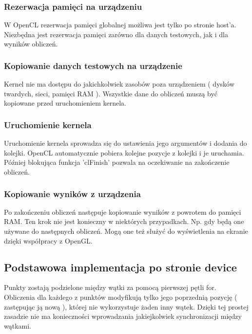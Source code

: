 \subsubsection{ Rezerwacja pamięci na urządzeniu }

W OpenCL rezerwacja pamięci globalnej możliwa jest tylko po stronie host'a. Niezbędna jest rezerwacja pamięci zarówno dla danych testowych, jak i dla wyników obliczeń.

\subsubsection{ Kopiowanie danych testowych na urządzenie }
 
Kernel nie ma dostępu do jakichkolwiek zasobów poza urządzeniem ( dysków twardych, sieci, pamięci RAM ). Wszystkie dane do obliczeń muszą być kopiowane przed uruchomieniem kernela.

\subsubsection{ Uruchomienie kernela }

Uruchomienie kernela sprowadza się do ustawienia jego argumentów i dodania do kolejki. OpenCL automatycznie pobiera kolejne pozycje z kolejki i je uruchamia. Później blokująca funkcja 'clFinish' pozwala na oczekiwanie na zakończenie obliczeń.


\subsubsection{ Kopiowanie wyników z urządzenia }
Po zakończeniu obliczeń następuje kopiowanie wyników z powrotem do pamięci RAM. Ten krok nie jest konieczny w niektórych przypadkach. Np. gdy będą one używane do następnych obliczeń. Mogą one też służyć do wyświetlenia na ekranie dzięki współpracy z OpenGL. 


\subsection{ Podstawowa implementacja po stronie device }

Punkty zostają podzielone między wątki za pomocą pierwszej pętli for. Obliczenia dla każdego z punktów modyfikują tylko jego poprzednią pozycję ( zastępując ją nową ), której nie wykorzystuje żaden inny wątek. Dzięki tej prostej zasadzie nie ma konieczności wprowadzania jakiejkolwiek synchronizacji między wątkami.


